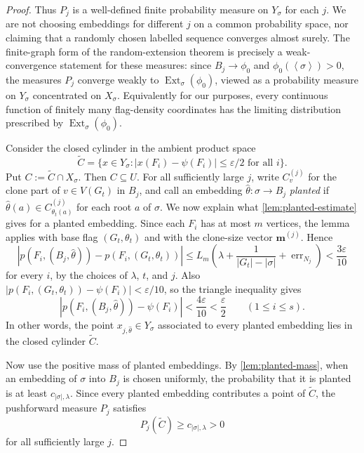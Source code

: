 \documentclass[11pt]{article}
\theoremstyle{definition}
\newcommand{\Ext}{\operatorname{Ext}}
\newcommand{\brak}[1]{\left\langle #1\right\rangle}
\newcommand{\eps}{\varepsilon}
\begin{document}
\begin{proof}
Thus $P_j$ is a well-defined finite probability measure on $Y_\sigma$ for each
$j$.  We are not choosing embeddings for different $j$ on a common probability
space, nor claiming that a randomly chosen labelled sequence converges almost
surely.  The finite-graph form of the random-extension theorem is precisely a
weak-convergence statement for these measures: since $B_j\to\phi_0$ and
$\phi_0(\brak\sigma)>0$, the measures $P_j$ converge weakly to
$\Ext_\sigma(\phi_0)$, viewed as a probability measure on $Y_\sigma$ concentrated
on $X_\sigma$.  Equivalently for our purposes, every continuous function of
finitely many flag-density coordinates has the limiting distribution prescribed
by $\Ext_\sigma(\phi_0)$.

Consider the closed cylinder in the ambient product space
\[
  \widetilde C=
  \{x\in Y_\sigma:
    |x(F_i)-\psi(F_i)|\le\eps/2\text{ for all }i\}.
\]
Put $C:=\widetilde C\cap X_\sigma$.  Then $C\subseteq U$.  For all sufficiently
large $j$, write $C_v^{(j)}$ for the clone part of $v\in V(G_t)$ in $B_j$, and
call an embedding $\widehat\theta:\sigma\to B_j$ \emph{planted} if
$\widehat\theta(a)\in C_{\theta_t(a)}^{(j)}$ for each root $a$ of
$\sigma$.  We now explain what \cref{lem:planted-estimate} gives for a planted
embedding.  Since each $F_i$ has at most $m$ vertices, the lemma applies with
base flag $(G_t,\theta_t)$ and with the clone-size vector
$\mathbf m^{(j)}$.  Hence
\[
  |p(F_i,(B_j,\widehat\theta))-p(F_i,(G_t,\theta_t))|
  \le
  L_m\left(\lambda+\frac1{|G_t|-|\sigma|}+\operatorname{err}_{N_j}\right)
  <\frac{3\eps}{10}
\]
for every $i$, by the choices of $\lambda$, $t$, and $j$.  Also
$|p(F_i,(G_t,\theta_t))-\psi(F_i)|<\eps/10$, so the triangle inequality gives
\[
  |p(F_i,(B_j,\widehat\theta))-\psi(F_i)|<\frac{4\eps}{10}<\frac{\eps}{2}
  \qquad(1\le i\le s).
\]
In other words, the point $x_{j,\widehat\theta}\in Y_\sigma$ associated to every
planted embedding lies in the closed cylinder $\widetilde C$.

Now use the positive mass of planted embeddings.  By \cref{lem:planted-mass},
when an embedding of $\sigma$ into $B_j$ is chosen uniformly, the
probability that it is planted is at least $c_{|\sigma|,\lambda}$.  Since every
planted embedding contributes a point of $\widetilde C$, the pushforward measure
$P_j$ satisfies
\[
  P_j(\widetilde C)\ge c_{|\sigma|,\lambda}>0
\]
for all sufficiently large $j$.


\end{proof}
\end{document}
